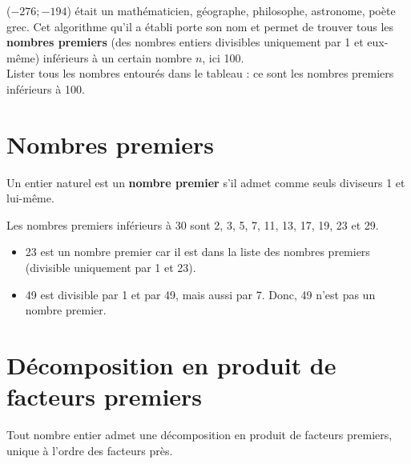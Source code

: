 \begin{activite}
\begin{QCM}
    ($-276 ; -194$) était un mathématicien, géographe, philosophe, astronome, poète grec. Cet algorithme qu'il a établi porte son nom et permet de trouver tous les {\bf nombres premiers} (des nombres entiers divisibles uniquement par 1 et eux-même) inférieurs à un certain nombre $n$, ici 100. \\ [3mm]
      Lister tous les nombres entourés dans le tableau : ce sont les nombres premiers inférieurs à 100. \par \medskip
      \pointilles \par \medskip
      \pointilles \medskip
   \end{QCM}
 \end{activite}


\cours 

\section{Nombres premiers}

\begin{definition}
   Un entier naturel est un \textbf{nombre premier} s'il admet comme seuls diviseurs 1 et lui-même.
\end{definition}

\begin{propriete}
   Les nombres premiers inférieurs à 30 sont 2, 3, 5, 7, 11, 13, 17, 19, 23 et 29.
\end{propriete}

\begin{exemple*1}
   \begin{itemize}
      \item 23 est un nombre premier car il est dans la liste des nombres premiers (divisible uniquement par 1 et 23).
      \item 49 est divisible par 1 et par 49, mais aussi par 7. Donc, 49 n'est pas un nombre premier. \vspace*{-5mm}
   \end{itemize}
\end{exemple*1}


\section{Décomposition en produit de facteurs premiers}

\begin{propriete}
   Tout nombre entier admet une décomposition en produit de facteurs premiers, unique à l'ordre des facteurs près. 
\end{propriete}

